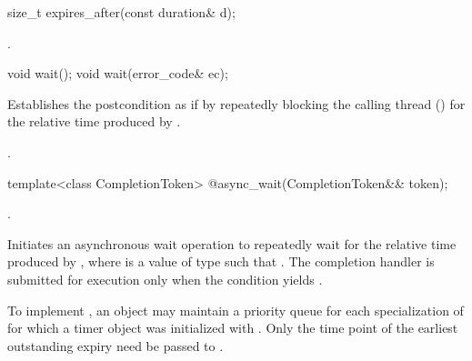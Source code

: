 %
\begin{itemdecl}
size_t expires_after(const duration& d);
\end{itemdecl}

\begin{itemdescr}
\pnum
\returns {}.
\end{itemdescr}

%
\begin{itemdecl}
void wait();
void wait(error_code& ec);
\end{itemdecl}

\begin{itemdescr}
\pnum
\effects Establishes the postcondition as if by repeatedly blocking the calling thread () for the relative time produced by .

\pnum
\postconditions {}.
\end{itemdescr}

%
%
\begin{itemdecl}
template<class CompletionToken>
  @\DEDUCED@ async_wait(CompletionToken&& token);
\end{itemdecl}

\begin{itemdescr}
\pnum
\completionsig {}.

\pnum
\effects Initiates an asynchronous wait operation to repeatedly wait for the relative time produced by , where  is a value of type  such that . The completion handler is submitted for execution only when the condition  yields .

\pnum
\begin{note} To implement , an  object  may maintain a priority queue for each specialization of  for which a timer object was initialized with . Only the time point  of the earliest outstanding expiry need be passed to . \end{note}
\end{itemdescr}




